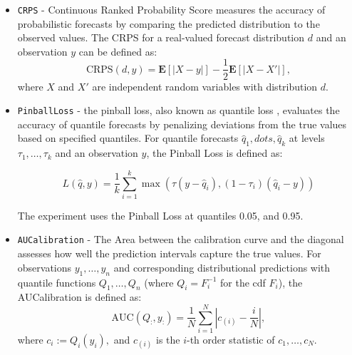 \begin{itemize}
    
    \item \texttt{CRPS} - Continuous Ranked Probability Score \cite{matheson1976} measures the accuracy of probabilistic forecasts by comparing the predicted distribution to the observed values. The CRPS for a real-valued forecast distribution $d$ and an observation $y$ can be defined as:
    \[
    \text{CRPS}(d, y) = \mathbf{E} \left[ \left| X - y \right| \right] - \frac{1}{2} \mathbf{E} \left[ \left| X - X' \right| \right],
    \]
    where $X$ and $X'$ are independent random variables with distribution $d$.
    
    \item \texttt{PinballLoss} - the pinball loss, also known as quantile loss \cite{pinball_loss}, evaluates the accuracy of quantile forecasts by penalizing deviations from the true values based on specified quantiles.
    For quantile forecasts $\hat{q}_1, dots, \hat{q}_k$ at levels $\tau_1, \dots, \tau_k$ and an observation $y$, the Pinball Loss is defined as:

    \begin{equation}
    L(\hat{q}, y) = \frac{1}{k} \sum_{i=1}^k \max \left(\tau (y - \hat{q}_i), (1 - \tau_i) (\hat{q}_i - y)\right)
    \end{equation}

    The experiment uses the Pinball Loss at quantiles 0.05, and 0.95.

    \item \texttt{AUCalibration} - The Area between the calibration curve and the diagonal assesses how well the prediction intervals capture the true values. For observations $y_1, \dots, y_n$ and corresponding distributional predictions with quantile functions $Q_1, \dots, Q_n$ (where $Q_i = F^{-1}_i$ for the cdf $F_i$), the AUCalibration is defined as:
    \begin{equation}
    \mbox{AUC} (Q_:, y_:) = \frac{1}{N} \sum_{i=1}^N \left| c_{(i)} - \frac{i}{N}\right|,
    \end{equation}
    where $c_i := Q_i(y_i),$ and $c_{(i)}$ is the $i$-th order statistic of $c_1, \dots, c_N$.


\end{itemize}
